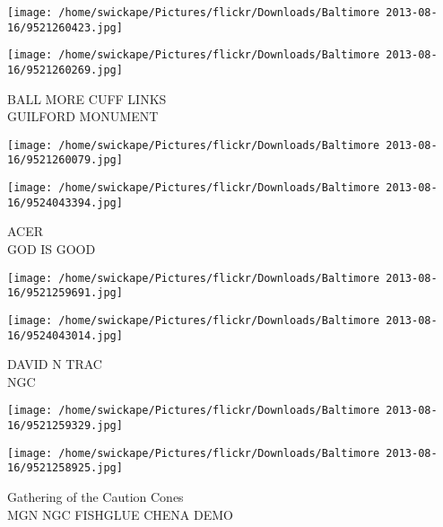 \documentclass[10pt,letterpaper]{article}
\begin{document}
\texttt{[image: /home/swickape/Pictures/flickr/Downloads/Baltimore 2013-08-16/9521260423.jpg]}

\vspace{0.25in}
\texttt{[image: /home/swickape/Pictures/flickr/Downloads/Baltimore 2013-08-16/9521260269.jpg]}

BALL MORE CUFF LINKS\\
GUILFORD MONUMENT
\pagebreak

\texttt{[image: /home/swickape/Pictures/flickr/Downloads/Baltimore 2013-08-16/9521260079.jpg]}

\vspace{0.25in}
\texttt{[image: /home/swickape/Pictures/flickr/Downloads/Baltimore 2013-08-16/9524043394.jpg]}

ACER\\
GOD IS GOOD
\pagebreak

\texttt{[image: /home/swickape/Pictures/flickr/Downloads/Baltimore 2013-08-16/9521259691.jpg]}

\vspace{0.25in}
\texttt{[image: /home/swickape/Pictures/flickr/Downloads/Baltimore 2013-08-16/9524043014.jpg]}

DAVID N TRAC\\
NGC
\pagebreak

\texttt{[image: /home/swickape/Pictures/flickr/Downloads/Baltimore 2013-08-16/9521259329.jpg]}

\vspace{0.25in}
\texttt{[image: /home/swickape/Pictures/flickr/Downloads/Baltimore 2013-08-16/9521258925.jpg]}

Gathering of the Caution Cones\\
MGN NGC FISHGLUE CHENA DEMO
\pagebreak
\end{document}
